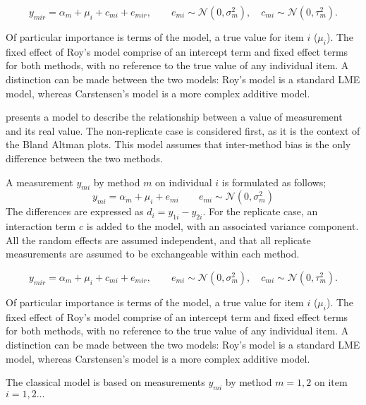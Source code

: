 \documentclass[12pt, a4paper]{report}
\theoremstyle{plain}
\theoremstyle{definition}
\theoremstyle{remark}
\begin{document}
\begin{equation}
y_{mir}  = \alpha_{m} + \mu_{i} + c_{mi} + e_{mir}, \qquad  e_{mi}
\sim \mathcal{N}(0,\sigma^{2}_{m}), \quad c_{mi} \sim \mathcal{N}(0,\tau^{2}_{m}).
\end{equation}

Of particular importance is terms of the model, a true value for item $i$ ($\mu_{i}$).  The fixed effect of Roy's model comprise of an intercept term and fixed effect terms for both methods, with no reference to the true value of any individual item. A distinction can be made between the two models: Roy's model is a standard LME model, whereas Carstensen's model is a more complex additive model.

\citet{BXC2004} presents a model to describe the relationship between a value of measurement and its
real value. The non-replicate case is considered first, as it is the context of the Bland Altman plots. This model assumes that inter-method bias is the only difference between the two methods.

A measurement $y_{mi}$ by method $m$ on individual $i$ is formulated as follows;
\begin{equation}
y_{mi}  = \alpha_{m} + \mu_{i} + e_{mi} \qquad  e_{mi} \sim
\mathcal{N}(0,\sigma^{2}_{m})
\end{equation}
The differences are expressed as $d_{i} = y_{1i} - y_{2i}$. For the replicate case, an interaction term $c$ is added to the model, with an associated variance component. All the random effects are assumed independent, and that all replicate measurements are assumed to be exchangeable within each method.

\begin{equation}
y_{mir}  = \alpha_{m} + \mu_{i} + c_{mi} + e_{mir}, \qquad  e_{mi}
\sim \mathcal{N}(0,\sigma^{2}_{m}), \quad c_{mi} \sim \mathcal{N}(0,\tau^{2}_{m}).
\end{equation}

Of particular importance is terms of the model, a true value for item $i$ ($\mu_{i}$).  The fixed effect of Roy's model comprise of an intercept term and fixed effect terms for both methods, with no reference to the true value of any individual item. A distinction can be made between the two models: Roy's model is a standard LME model, whereas Carstensen's model is a more complex additive model.

The classical model is based on measurements $y_{mi}$
by method $m=1,2$ on item $i = 1,2 \ldots$
\end{document}
